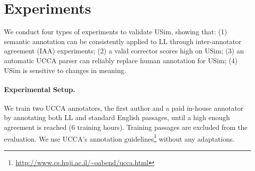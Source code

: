 \documentclass[a4paper, 11pt]{article}
\begin{document}
%
%
%

\section{Experiments}


We conduct four types of experiments to validate {\sc USim}, showing that:
(1) semantic annotation can be consistently applied to LL through inter-annotator agreement (IAA) experiments;
(2) a valid corrector scores high on {\sc USim};
(3) an automatic UCCA parser can reliably replace human annotation for {\sc USim};
(4) {\sc USim} is sensitive to changes in meaning.

\paragraph{Experimental Setup.}
We train two UCCA annotators, the first author and a paid in-house annotator by annotating both LL and standard English
passages, until a high enough agreement is reached (6 training hours).
Training passages are excluded from the evaluation.
We use UCCA's annotation
guidelines\footnote{\url{http://www.cs.huji.ac.il/~oabend/ucca.html}}
without any adaptations.
\end{document}
